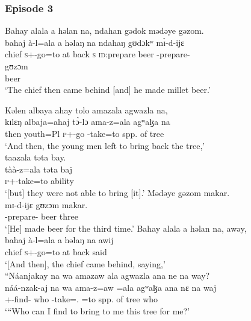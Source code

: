  \subsubsection*{Episode 3}
\ea   Bahay  alala  a  həlan  na,  ndahan  gədok  mədəye  gəzom.\\
\gll  bahaj  à-l=ala    a   həlaŋ   na  ndahaŋ  gʊdɔkʷ m\`ɪ-d-ijɛ\\      
 chief   \textsc{s}+{\PFV}-go=to   at   back   {\PSP}  \textsc{s}        {\textsc{id}:prepare beer}  {\NOM}-prepare-{\CL}\\ 
 
 \medskip
 \gll gʊzɔm\\
      beer \\
 \glt ‘The chief then came behind [and] he made millet beer.’
 \z
 
\ea  Kəlen  albaya  ahay  tolo  amazala  agwazla  na,\\
 \gll kɪlɛŋ  albaja=ahaj    t\`ɔ-lɔ      ama-z=ala   agʷaɮa  na\\
 then   youth=Pl      \textsc{p}+{\PFV}-go   {\DEP}-take=to  {spp. of tree}  {\PSP}\\
 \glt ‘And then, the young men left to bring back the tree,’\\
 
 \medskip
  taazala təta  bay.\\
 \gll tàà-z=ala  təta baj\\
 \textsc{p}+{\HOR}-take=to      ability  {\NEG}\\
 \glt ‘[but] they were not able to bring [it].’  
 \z
\ea   Mədəye  gəzom  makar.  \\
 \gll mɪ-d-ijɛ      gʊzɔm     makar. \\
 {\NOM}{}-prepare{}-{\CL}       beer  three\\
 \glt ‘[He] made beer for the third time.’
 \z
\ea   Bahay  alala  a  həlan  na,  awəy,\\
 \gll bahaj    à-l=ala      a   həlaŋ   na awij\\
 chief   \textsc{s}+{\PFV}-go=to   at   back   {\PSP}  said  \\  
 \glt ‘[And then], the chief came behind, saying,’\\
 
 \medskip
  “Náanjakay  na  wa  amazaw  ala  agwazla  ana  ne  na  way?\\
 \gll náá-nzak-aj        na       wa  ama-z=aw =ala      agʷaɮa    ana     nɛ   na  waj\\
 {\oneS}+\textsc{{\POT}}{}-find{}-{\CL}   {\PSP}   who   {\DEP}-take={\oneS}.{\IO}  =to    {spp. of tree}     {\DAT}    {\oneS}    {\PSP}  who\\
 \glt ‘“Who can I find to bring to me this tree for me?’\\
 
